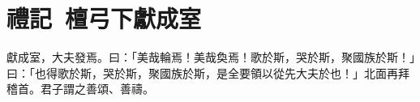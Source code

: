\section[晉獻文子成室\quad{\small 禮記 檀弓下}]{{\normalsize 禮記\ 檀弓下}\quad {}獻成室}
獻成室，大夫發焉。曰：「美哉輪焉！美哉奐焉！歌於斯，哭於斯，聚國族於斯！」曰：「也得歌於斯，哭於斯，聚國族於斯，是全要領以從先大夫於也！」北面再拜稽首。君子謂之善頌、善禱。


